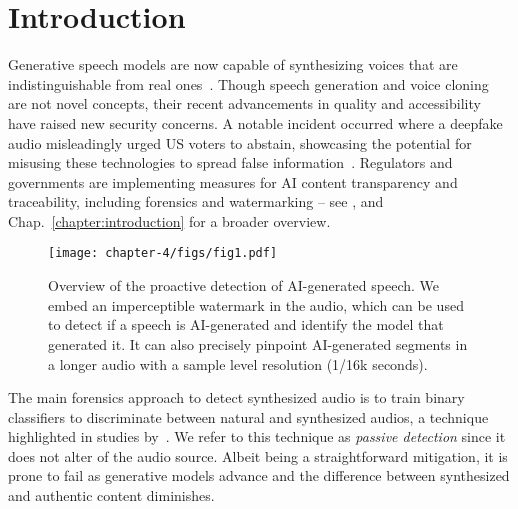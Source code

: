 
\section{Introduction}

Generative speech models are now capable of synthesizing voices that are indistinguishable from real ones~\citep{arik2018neural, kim2021conditional, casanova2022yourtts, wang2023neural}.
Though speech generation and voice cloning are not novel concepts, their recent advancements in quality and accessibility have raised new security concerns. 
A notable incident occurred where a deepfake audio misleadingly urged US voters to abstain, showcasing the potential for misusing these technologies to spread false information~\citep{murphy2024biden}.
Regulators and governments are implementing measures for AI content transparency and traceability, including forensics and watermarking -- see \citet{ChineseAIGovernance, EuropeanAIAct, USAIAnnouncement}, and Chap.~\ref{chapter:introduction} for a broader overview.

\begin{figure}[t]
    \centering
    \texttt{[image: chapter-4/figs/fig1.pdf]}
    \caption{
        Overview of the proactive detection of AI-generated speech.
        We embed an imperceptible watermark in the audio, which can be used to detect if a speech is AI-generated and identify the model that generated it.
        It can also precisely pinpoint AI-generated segments in a longer audio with a sample level resolution (1/16k seconds).
        }
    \label{chap4/fig:fig1}
\end{figure}

The main forensics approach to detect synthesized audio is to train binary classifiers to discriminate between natural and synthesized audios, a technique highlighted in studies by~\citet{Borsos2022AudioLMAL, Kharitonov2023SpeakRA, le2023voicebox}.
We refer to this technique as \textit{passive detection} since it does not alter of the audio source. 
Albeit being a straightforward mitigation, 
it is prone to fail as generative models advance and the difference between synthesized and authentic content diminishes. 


